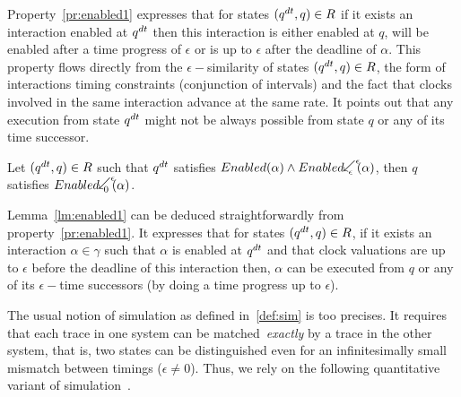 Property~\ref{pr:enabled1} expresses that for states $(q^{dt},q)\in R$ if it exists
an interaction enabled at $q^{dt}$ then this interaction is either enabled at $q$, 
will be enabled after a time progress of $\epsilon$ or is up to $\epsilon$ after 
the deadline of $\alpha$. This property flows directly from the $\epsilon-$similarity
of states $(q^{dt},q)\in R$, the form of interactions timing constraints 
(conjunction of intervals)
and the fact that clocks involved in the same interaction advance at the same rate. 
It points out that any execution from
state $q^{dt}$ might not be always possible from state $q$ or any of its time successor.

\begin{lemma}\label{lm:enabled1}
  Let $(q^{dt},q)\in R$ such that $q^{dt}$ satisfies $\enabled{\alpha}\wedge
  \enabledbackwardb{\alpha}{\epsilon}{\epsilon}$, then
  $q$ satisfies $\enabledbackwardb{\alpha}{0}{\epsilon}$.
\end{lemma}
Lemma~\ref{lm:enabled1} can be deduced straightforwardly from property~\ref{pr:enabled1}.
It expresses that for states $(q^{dt},q)\in R$, if it exists an interaction $\alpha\in\gamma$
such that $\alpha$ is enabled at $q^{dt}$ and that clock valuations are up to $\epsilon$ 
before the deadline of this interaction then, $\alpha$ can be executed from $q$ or any of its 
$\epsilon-$time successors (by doing a time progress up to $\epsilon$).

The usual notion of simulation as defined in~\ref{def:sim} is too precises. 
It requires that each trace in one system
can be matched~\emph{exactly} by a trace in the other system, that is, 
two states can be distinguished even for an infinitesimally
small mismatch between timings ($\epsilon\neq0$). 
Thus, we rely on the following quantitative variant of simulation~\cite{drift:esim}. 


